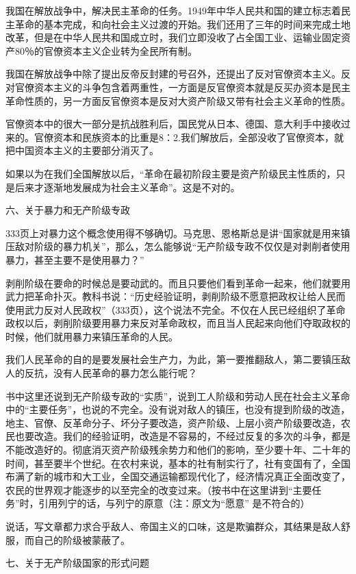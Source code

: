 我国在解放战争中，解决民主革命的任务。1949年中华人民共和国的建立标志着民主革命的基本完成，和向社会主义过渡的开始。我们还用了三年的时间来完成土地改革，但是在中华人民共和国成立时，我们立即没收了占全国工业、运输业固定资产80％的官僚资本主义企业转为全民所有制。

我国在解放战争中除了提出反帝反封建的号召外，还提出了反对官僚资本主义。反对官僚资本主义的斗争包含着两重性，一方面是反官僚资本就是反买办资本是民主革命性质的，另一方面反官僚资本是反对大资产阶级又带有社会主义革命的性质。

官僚资本中的很大一部分是抗战胜利后，国民党从日本、德国、意大利手中接收过来的。官僚资本和民族资本的比重是8：2.我们解放后，全部没收了官僚资本，就把中国资本主义的主要部分消灭了。

如果以为在我们全国解放以后，“革命在最初阶段主要是资产阶级民主性质的，只是后来才逐渐地发展成为社会主义革命”。这是不对的。

六、关于暴力和无产阶级专政

333页上对暴力这个概念使用得不够确切。马克思、恩格斯总是讲“国家就是用来镇压敌对阶级的暴力机关”，那么，怎么能够说“无产阶级专政不仅仅是对剥削者使用暴力，甚至主要不是使用暴力？”

剥削阶级在要命的时候总是要动武的。而且只要他们看到革命一起来，他们就要用武力把革命扑灭。教科书说：“历史经验证明，剥削阶级不愿意把政权让给人民而使用武力反对人民政权”（333页），这个说法不完全。不仅在人民已经组织了革命政权以后，剥削阶级要用暴力来反对革命政权，而且当人民起来向他们夺取政权的时候，他们就用暴力来镇压革命的人民。

我们人民革命的自的是要发展社会生产力，为此，第一要推翻敌人，第二要镇压敌人的反抗，没有人民革命的暴力怎么能行呢？

书中这里还说到无产阶级专政的“实质”，说到工人阶级和劳动人民在社会主义革命中的“主要任务”，也说的不完全。没有说对敌人的镇压，也没有提到阶级的改造，地主、官僚、反革命分子、坏分子要改造，资产阶级、上层小资产阶级要改造，农民也要改造。我们的经验证明，改造是不容易的，不经过反复的多次的斗争，都是不能改造好的。彻底消灭资产阶级残余势力和他们的影响，至少要十年、二十年的时间，甚至要半个世纪。在农村来说，基本的社有制实行了，社有变国有了，全国布满了新的城市和大工业，全国交通运输都现代化了，经济情况真正全面改变了，农民的世界观才能逐步的以至完全的改变过来。（按书中在这里讲到“主要任务”时，引用列宁的话，与列宁的原意（注：原文为“愿意” 是不符合的）

说话，写文章都力求合乎敌人、帝国主义的口味，这是欺骗群众，其结果是敌人舒服，而自己的阶级被蒙蔽了。

七、关于无产阶级国家的形式问题

